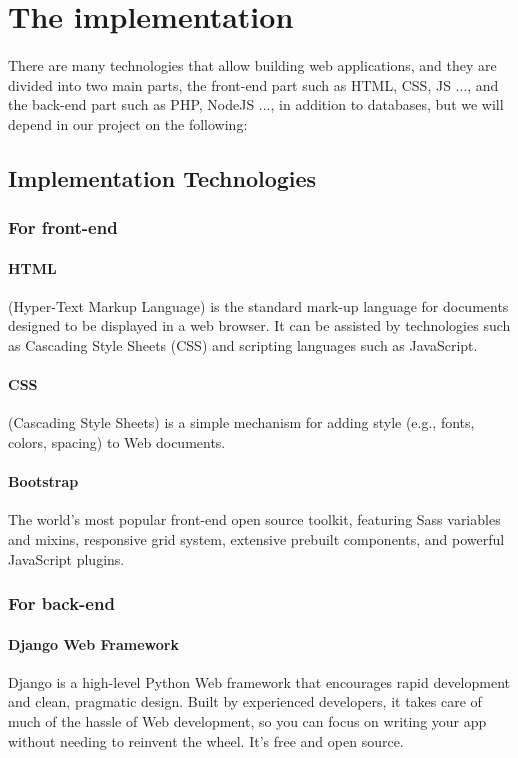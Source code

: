 \section{The implementation}
	\paragraph{}
	There are many technologies that allow building web applications, and they are divided into two main parts, the front-end part such as HTML, CSS, JS ..., and the back-end part such as PHP, NodeJS ..., in addition to databases, but we will depend in our project on the following:
	\subsection{Implementation Technologies}
		\subsubsection{For front-end}
			\paragraph{HTML}
			(Hyper-Text Markup Language) is the standard mark-up language for documents designed to be displayed in a web browser. It can be assisted by technologies such as Cascading Style Sheets (CSS) and scripting languages such as JavaScript.\cite{HTML}
			\paragraph{CSS}
			(Cascading Style Sheets) is a simple mechanism for adding style (e.g., fonts, colors, spacing) to Web documents.\cite{CSS}
			\paragraph{Bootstrap}
			The world’s most popular front-end open source toolkit, featuring Sass variables and mixins, responsive grid system, extensive prebuilt components, and powerful JavaScript plugins.\cite{Bootstrap}
		\subsubsection{For back-end}
			\paragraph{Django Web Framework}
			Django is a high-level Python Web framework that encourages rapid development and clean, pragmatic design. Built by experienced developers, it takes care of much of the hassle of Web development, so you can focus on writing your app without needing to reinvent the wheel. It’s free and open source.\cite{Django}
